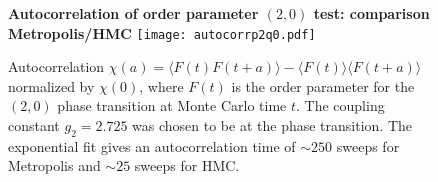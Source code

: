\documentclass[12pt,a4paper]{article}
\begin{document}
\begin{figure}[hp]
\centering
\textbf{Autocorrelation of order parameter $(2,0)$ test: comparison Metropolis/HMC}
\texttt{[image: autocorrp2q0.pdf]}
\caption{Autocorrelation $\chi (a) = \langle F(t)F(t+a) \rangle - \langle F(t) \rangle \langle F(t+a) \rangle$ normalized by $\chi(0)$, where $F(t)$ is the order parameter for the $(2,0)$ phase transition at Monte Carlo time $t$. The coupling constant $g_2 = 2.725$ was chosen to be at the phase transition. The exponential fit gives an autocorrelation time of $\sim 250$ sweeps for Metropolis and $\sim 25$ sweeps for HMC.}
\end{figure}
\end{document}
